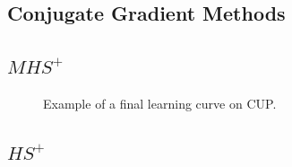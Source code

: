 \begin{appendices}
        \section{Conjugate Gradient Methods}
        \label{sec:cgd}
            \subsection{$MHS^+$}
            \label{sec:cup_msh}

                \begin{figure}[H]
                    \centering
                        \label{fig:cup_mhs}
                    \caption{Example of a final learning curve on CUP.}
                \end{figure}

            \subsection{$HS^+$}
            \label{sec:cup_hs}


\end{appendices}
